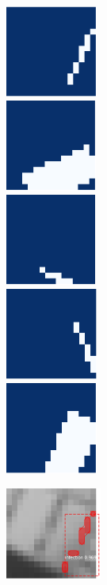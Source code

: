 \begin{figure}[H]
\begin{minipage}[c]{.3\textwidth}
  \centering
  \includegraphics[height=3cm]{pics/mask-3-2.png}
  \\ \vspace{.25cm}
  \includegraphics[height=3cm]{pics/mask-3-3.png}
  \\ \vspace{.25cm}
  \includegraphics[height=3cm]{pics/mask-3-4.png}
  \\ \vspace{.25cm}
  \includegraphics[height=3cm]{pics/mask-3-5.png}
  \\ \vspace{.25cm}
  \includegraphics[height=3cm]{pics/mask-3-1.png}
  \end{minipage}
  \begin{minipage}[c]{.3\textwidth}
  \centering
  \includegraphics[height=3cm]{pics/pred-3-2.png}

\end{minipage}
\end{figure}
